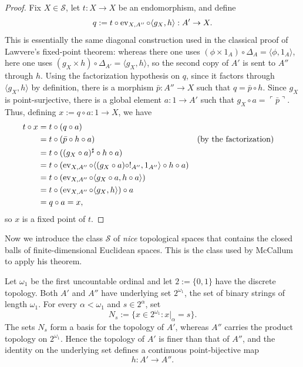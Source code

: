 \begin{proof}
    Fix $X\in\mathcal S$, let $t:X\to X$ be an endomorphism, and define
    \[ q:=t\circ\operatorname{ev}_{X,A''}\circ\langle g_X,h\rangle:A'\to X. \]
    This is essentially the same diagonal construction used in the classical proof of Lawvere's fixed-point theorem: whereas there one uses $(\phi\times 1_A)\circ\Delta_A=\langle\phi,1_A\rangle$, here one uses $(g_X\times h)\circ\Delta_{A'}=\langle g_X,h\rangle$, so the second copy of $A'$ is sent to $A''$ through $h$.\newline
    Using the factorization hypothesis on $q$, since it factors through $\langle g_X,h\rangle$ by definition, there is a morphism $\bar p : A''\to X$ such that $q=\bar p\circ h$.
    Since $g_X$ is point-surjective, there is a global element $a:1\to A'$ such that $g_X\circ a=\ulcorner\bar p\urcorner$.
    Thus, defining $x:=q\circ a:1\to X$, we have
    \begin{align*}
        t \circ x &= t \circ (q \circ a) \\
                  &= t \circ (\bar p \circ h \circ a) &&(\text{by the factorization}) \\
                  &= t \circ ((g_X \circ a)^\sharp \circ h \circ a) \\
                  &= t \circ (\operatorname{ev}_{X,A''} \circ \langle (g_X \circ a) \circ !_{A''}, 1_{A''} \rangle \circ h \circ a) \\
                  &= t \circ (\operatorname{ev}_{X,A''} \circ \langle g_X \circ a, h \circ a \rangle) \\
                  &= t \circ (\operatorname{ev}_{X,A''} \circ \langle g_X, h \rangle) \circ a \\
                  &= q \circ a = x,
    \end{align*}
    so $x$ is a fixed point of $t$.
\end{proof}

Now we introduce the class $\mathcal S$ of \emph{nice} topological spaces that contains the closed balls of finite-dimensional Euclidean spaces.
This is the class used by McCallum to apply his theorem.

\begin{notation}\label{idx:mccallum-spaces}
    Let $\omega_1$ be the first uncountable ordinal and let $2:=\{0,1\}$ have the discrete topology.
    Both $A'$ and $A''$ have underlying set $2^{\omega_1}$, the set of binary strings of length $\omega_1$.
    For every $\alpha<\omega_1$ and $s\in 2^\alpha$, set
    \[ N_s:=\{x\in 2^{\omega_1} : x|_\alpha=s\}. \]
    The sets $N_s$ form a basis for the topology of $A'$, whereas $A''$ carries the product topology on $2^{\omega_1}$.
    Hence the topology of $A'$ is finer than that of $A''$, and the identity on the underlying set defines a continuous point-bijective map
    \[ h:A'\to A''. \]
\end{notation}

